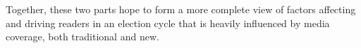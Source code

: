 

Together, these two parts hope to form a more complete view of factors affecting and driving readers in an election cycle that is heavily influenced by media coverage, both traditional and new.





\afterpage{\blankpage}

 